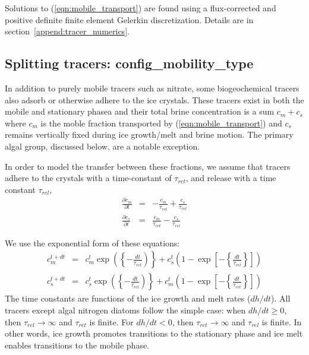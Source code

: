 Solutions to (\ref{eqn:mobile_transport}) are found using a flux-corrected and
positive definite finite element
Gelerkin discretization.  Details are in section~\ref{append:tracer_numerics}.

\subsection{Splitting tracers:  config\_mobility\_type}
In addition to purely mobile tracers such as nitrate, some biogeochemical tracers also adsorb or
otherwise adhere to the ice crystals.  These tracers exist in both the
mobile and stationary phasea and their  
total brine concentration is a sum $c_m + c_s$
where $c_m$ is the moble fraction transported by
(\ref{eqn:mobile_transport}) and $c_s$  remains vertically fixed during ice growth/melt and brine motion.  The primary algal group, discussed below,  are a notable exception.  

In order to model the transfer between these fractions, we assume that tracers adhere to the crystals with a time-constant of
$\tau_{ret}$, and release with a time constant $\tau_{rel}$, \bgcie
\begin{eqnarray}
\frac{\partial c_m}{\partial t} & = & -\frac{c_m}{\tau_{ret}} + \frac{c_s}{\tau_{rel}} \\
\nonumber
\frac{\partial c_s}{\partial t} & = &\frac{c_m}{\tau_{ret}} - \frac{c_s}{\tau_{rel}}
\end{eqnarray}
 
We use the exponential form of these equations:
\begin{eqnarray}
c_m^{t+dt} & = &
c_m^t\exp\left(\left\{-\frac{dt}{\tau_{ret}}\right)\right\} +
c^t_s\left(1- \exp\left[-\left\{\frac{dt}{\tau_{rel}}\right\}\right]\right)  \nonumber
\end{eqnarray}
\begin{eqnarray}
c_s^{t+dt} & = & c_s^t\exp\left(\left\{-\frac{dt}{\tau_{rel}}\right)\right\} +
c_m^t\left(1-\exp\left[-\left\{\frac{dt}{\tau_{ret}}\right\}\right]\right) \nonumber
\end{eqnarray}
The time constants are functions of the ice growth and melt rates
($dh/dt$). All tracers except algal nitrogen diatoms follow the 
simple case: when $dh/dt \geq 0$, then $\tau_{rel} \rightarrow \infty$ and
$\tau_{ret}$ is finite.  For $dh/dt < 0$, then $\tau_{ret} \rightarrow \infty$ and
$\tau_{rel}$ is finite.  In other words,  ice growth promotes transitions to the
stationary phase and ice melt enables transitions to the mobile phase.

